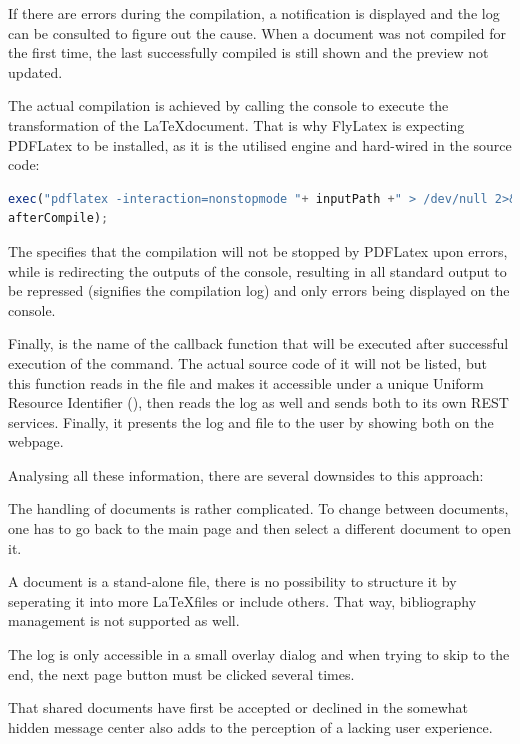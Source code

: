 If there are errors during the compilation, a notification is displayed and the log can be consulted to figure out the cause. When a document was not compiled for the first time, the last successfully compiled  is still shown and the preview not updated.

The actual compilation is achieved by calling the console to execute the transformation of the \LaTeX document. That is why FlyLatex is expecting PDFLatex to be installed, as it is the utilised engine and hard-wired in the source code:

\begin{lstlisting}[language=JavaScript, frame=none, numbers=none, caption=Latex Compilation in FlyLatex]
exec("pdflatex -interaction=nonstopmode "+ inputPath +" > /dev/null 2>&1", 
afterCompile);
\end{lstlisting}

The  specifies that the compilation will not be stopped by PDFLatex upon errors, while  is redirecting the outputs of the console, resulting in all standard output to be repressed (signifies the compilation log) and only errors being displayed on the console. 

Finally,  is the name of the callback function that will be executed after successful execution of the command. The actual source code of it will not be listed, but this function reads in the  file and makes it accessible under a unique Uniform Resource Identifier (), then reads the log as well and sends both to its own REST services. Finally, it presents the log and file to the user by showing both on the webpage.

Analysing all these information, there are several downsides to this approach:

The handling of documents is rather complicated. To change between documents, one has to go back to the main page and then select a different document to open it. 

A document is a stand-alone file, there is no possibility to structure it by seperating it into more \LaTeX files or include others. That way, bibliography management is not supported as well. 

The log is only accessible in a small overlay dialog and when trying to skip to the end, the next page button must be clicked several times. 

That shared documents have first be accepted or declined in the somewhat hidden message center also adds to the perception of a lacking user experience.

